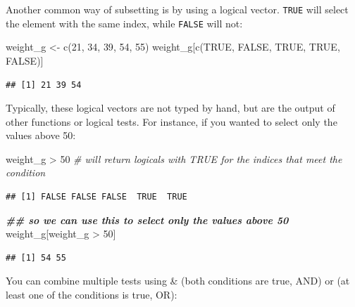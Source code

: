 \documentclass[
]{book}
\newenvironment{Shaded}{\begin{snugshade}}{\end{snugshade}}
\newcommand{\CommentTok}[1]{\textcolor[rgb]{0.56,0.35,0.01}{\textit{#1}}}
\newcommand{\ConstantTok}[1]{\textcolor[rgb]{0.00,0.00,0.00}{#1}}
\newcommand{\DecValTok}[1]{\textcolor[rgb]{0.00,0.00,0.81}{#1}}
\newcommand{\DocumentationTok}[1]{\textcolor[rgb]{0.56,0.35,0.01}{\textbf{\textit{#1}}}}
\newcommand{\FunctionTok}[1]{\textcolor[rgb]{0.00,0.00,0.00}{#1}}
\newcommand{\NormalTok}[1]{#1}
\newcommand{\OtherTok}[1]{\textcolor[rgb]{0.56,0.35,0.01}{#1}}
\newcommand{\SpecialCharTok}[1]{\textcolor[rgb]{0.00,0.00,0.00}{#1}}
\begin{document}
Another common way of subsetting is by using a logical vector. \texttt{TRUE} will select the element with the same index, while \texttt{FALSE} will not:

\begin{Shaded}
\begin{Highlighting}[]
\NormalTok{weight\_g }\OtherTok{\textless{}{-}} \FunctionTok{c}\NormalTok{(}\DecValTok{21}\NormalTok{, }\DecValTok{34}\NormalTok{, }\DecValTok{39}\NormalTok{, }\DecValTok{54}\NormalTok{, }\DecValTok{55}\NormalTok{)}
\NormalTok{weight\_g[}\FunctionTok{c}\NormalTok{(}\ConstantTok{TRUE}\NormalTok{, }\ConstantTok{FALSE}\NormalTok{, }\ConstantTok{TRUE}\NormalTok{, }\ConstantTok{TRUE}\NormalTok{, }\ConstantTok{FALSE}\NormalTok{)]}
\end{Highlighting}
\end{Shaded}

\begin{verbatim}
## [1] 21 39 54
\end{verbatim}

Typically, these logical vectors are not typed by hand, but are the output of other functions or logical tests. For instance, if you wanted to select only the values above 50:

\begin{Shaded}
\begin{Highlighting}[]
\NormalTok{weight\_g }\SpecialCharTok{\textgreater{}} \DecValTok{50}    \CommentTok{\# will return logicals with TRUE for the indices that meet the condition}
\end{Highlighting}
\end{Shaded}

\begin{verbatim}
## [1] FALSE FALSE FALSE  TRUE  TRUE
\end{verbatim}

\begin{Shaded}
\begin{Highlighting}[]
\DocumentationTok{\#\# so we can use this to select only the values above 50}
\NormalTok{weight\_g[weight\_g }\SpecialCharTok{\textgreater{}} \DecValTok{50}\NormalTok{]}
\end{Highlighting}
\end{Shaded}

\begin{verbatim}
## [1] 54 55
\end{verbatim}

You can combine multiple tests using \& (both conditions are true, AND) or \textbar{} (at least one of the conditions is true, OR):
\end{document}
